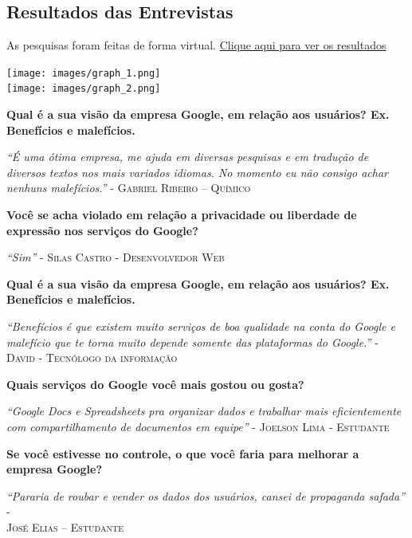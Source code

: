 \documentclass[a4paper]{article}
\begin{document}
\subsection{Resultados das Entrevistas}
\par As pesquisas foram feitas de forma virtual. \href{https://docs.google.com/forms/d/1R7aUG0Rk3e8IBl5C9skZ4EZBTYdEt05p6FwKriKgc9E/edit#responses}{\color{blue}Clique aqui para ver os resultados}\\
\begin{center}
    \texttt{[image: images/graph\_1.png]}\\[1cm]
    \texttt{[image: images/graph\_2.png]}
\end{center}
\par \textbf{Qual é a sua visão da empresa Google, em relação aos usuários? Ex. Benefícios e malefícios.}
\par \textit{“É uma ótima empresa, me ajuda em diversas pesquisas e em tradução de diversos textos nos mais variados idiomas. No momento eu não consigo achar nenhuns malefícios.”} - \textsc{Gabriel Ribeiro – Químico} \vspace{1mm}
\par \textbf{Você se acha violado em relação a privacidade ou liberdade de expressão nos serviços do Google?}
\par \textit{“Sim”} - \textsc{Silas Castro - Desenvolvedor Web} \vspace{1mm}
\par \textbf{Qual é a sua visão da empresa Google, em relação aos usuários? Ex. Benefícios e malefícios.}
\par \textit{“Benefícios é que existem muito serviços de boa qualidade na conta do Google e malefício que te torna muito depende somente das plataformas do Google.”
} - \textsc{David - Tecnólogo da informação} \vspace{1mm}
\par \textbf{Quais serviços do Google você mais gostou ou gosta?}
\par \textit{“Google Docs e Spreadsheets pra organizar dados e trabalhar mais eficientemente com compartilhamento de documentos em equipe”} - \textsc{Joelson Lima - Estudante} \vspace{1mm}
\par \textbf{Se você estivesse no controle, o que você faria para melhorar a empresa Google?}
\par \textit{“Pararia de roubar e vender os dados dos usuários, cansei de propaganda safada”} - \\ \textsc{José Elias – Estudante}
\end{document}
